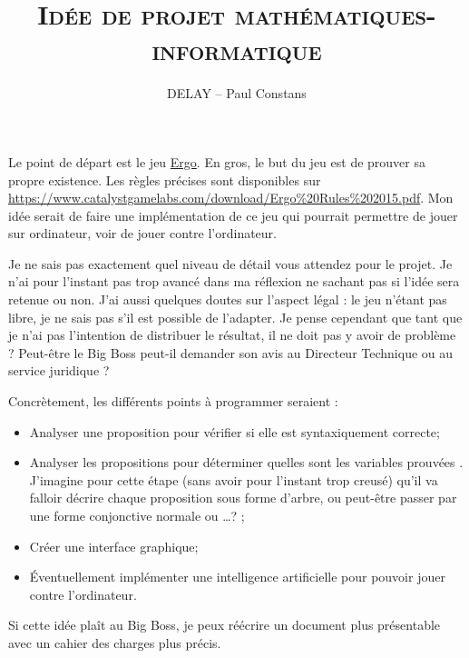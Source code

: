 \documentclass[11pt]{cours}
\title{\textbf{\textsc{Idée de projet mathématiques-informatique}}}
\author{DELAY -- Paul Constans}
\begin{document}
Le point de départ est le jeu \href{https://www.catalystgamelabs.com/ergo/}{Ergo}. En gros, le but du jeu est de prouver sa propre existence. Les règles précises sont disponibles sur \url{https://www.catalystgamelabs.com/download/Ergo%20Rules%202015.pdf}. Mon idée serait de faire une implémentation de ce jeu qui pourrait permettre de jouer sur ordinateur, voir de jouer contre l'ordinateur.

Je ne sais pas exactement quel niveau de détail vous attendez pour le projet. Je n'ai pour l'instant pas trop avancé dans ma réflexion ne sachant pas si l'idée sera retenue ou non. J'ai aussi quelques doutes sur l'aspect légal : le jeu n'étant pas libre, je ne sais pas s'il est possible de l'adapter. Je pense cependant que tant que je n'ai pas l'intention de distribuer le résultat, il ne doit pas y avoir de problème ? Peut-être le Big Boss peut-il demander son avis au Directeur Technique ou au service juridique ?

Concrètement, les différents points à programmer seraient :
\begin{itemize}
\item Analyser une proposition pour vérifier si elle est syntaxiquement correcte;
\item Analyser les propositions pour déterminer quelles sont les variables \og prouvées \fg. J'imagine pour cette étape (sans avoir pour l'instant trop creusé) qu'il va falloir décrire chaque proposition sous forme d'arbre, ou peut-être passer par une forme conjonctive normale ou \dots ? ;
\item Créer une interface graphique;
\item Éventuellement implémenter une \og intelligence artificielle \fg{} pour pouvoir jouer contre l'ordinateur.
\end{itemize}

\bigskip
Si cette idée plaît au Big Boss, je peux réécrire un document plus présentable avec un cahier des charges plus précis.
\end{document}
